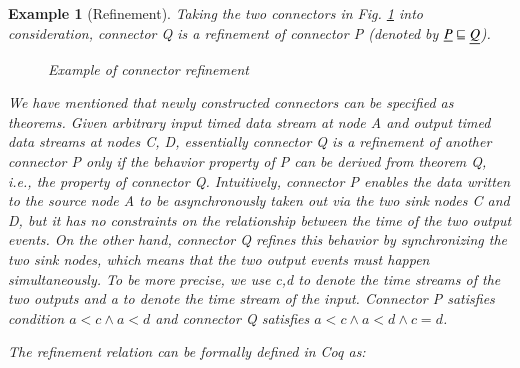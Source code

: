 \documentclass[3p,times]{elsarticle}
\newtheorem{example}{Example}[section]
\newtheorem{theorem}{Theorem}[section]
\begin{document}
\begin{example}[Refinement]
\label{ex:refine}
Taking the two connectors in Fig. \ref{refine} into consideration, connector \emph{Q} is a refinement of connector \emph{P} (denoted by $\emph{P} \sqsubseteq \emph{Q}$).
\begin{figure}
\vspace{0cm}
\centering
{}
\caption{Example of connector refinement}
\label{refine}
\end{figure}

We have mentioned that newly constructed connectors can be specified as theorems. Given arbitrary input timed
data stream at node \emph{A} and output timed data streams at nodes \emph{C}, \emph{D}, essentially connector
\emph{Q} is a refinement of another connector \emph{P} only if the behavior property of \emph{P} can
be derived from \emph{theorem Q}, i.e., the property of connector \emph{Q}. Intuitively, connector \emph{P} enables the
data written to the source node \emph{A} to be asynchronously taken out via the two sink nodes \emph{C} and \emph{D}, but
it has no constraints on the relationship between the time of the two output events. On the other hand,
connector \emph{Q} refines this behavior by synchronizing the two sink nodes, which means that the two output
events must happen simultaneously. To be more precise, we use \emph{c,d} to denote the time streams of the two outputs
and \emph{a} to denote the time stream of the input. Connector \emph{P} satisfies condition $a<c\wedge a<d$ and
connector \emph{Q} satisfies $a<c\wedge a<d \wedge c=d$.

The refinement relation can be formally defined in Coq as:




\end{example}
\end{document}
